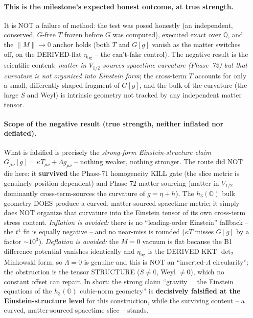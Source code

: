 \paragraph{This is the milestone's expected honest outcome, at true strength.}
It is NOT a failure of method: the test was posed honestly (an independent, conserved,
$G$-free $T$ frozen before $G$ was computed), executed exact over $\mathbb{Q}$, and the
$\|M\|\to0$ anchor holds (both $T$ and $G[g]$ vanish as the matter switches off, on the
DERIVED-flat $\eta_{\mathrm{bg}}$ -- the can't-fake control). The negative result is the
scientific content: \emph{matter in $V_{1/2}$ sources spacetime curvature (Phase~72) but
that curvature is not organized into Einstein form}; the cross-term $T$ accounts for only
a small, differently-shaped fragment of $G[g]$, and the bulk of the curvature (the large
$S$ and Weyl) is intrinsic geometry not tracked by any independent matter tensor.

\paragraph{Scope of the negative result (true strength, neither inflated nor deflated).}
What is falsified is precisely the \emph{strong-form Einstein-structure claim}
$G_{\mu\nu}[g]=\kappa T_{\mu\nu}+\Lambda g_{\mu\nu}$ -- nothing weaker, nothing stronger.
The route did NOT die here: it \textbf{survived} the Phase-71 homogeneity KILL gate (the
slice metric is genuinely position-dependent) and Phase-72 matter-sourcing (matter in
$V_{1/2}$ dominantly cross-term-sources the curvature of $g=\eta+h$). The $h_3(\mathbb{O})$
bulk geometry DOES produce a curved, matter-sourced spacetime metric; it simply does NOT
organize that curvature into the Einstein tensor of its own cross-term stress content.
\emph{Inflation is avoided:} there is no ``leading-order Einstein'' fallback -- the $t^4$
fit is equally negative -- and no near-miss is rounded ($\kappa T$ misses $G[g]$ by a
factor $\sim10^3$). \emph{Deflation is avoided:} the $M=0$ vacuum is flat because the B1
difference potential vanishes identically and $\eta_{\mathrm{bg}}$ is the DERIVED KKT
$\det_2$ Minkowski form, so $\Lambda=0$ is genuine and this is NOT an ``inserted-$\Lambda$
circularity''; the obstruction is the tensor STRUCTURE ($S\neq0$, Weyl $\neq0$), which no
constant offset can repair. In short: the strong claim
``gravity = the Einstein equations of the $h_3(\mathbb{O})$ cubic-norm geometry'' is
\textbf{decisively falsified at the Einstein-structure level} for this construction, while
the surviving content -- a curved, matter-sourced spacetime slice -- stands.

